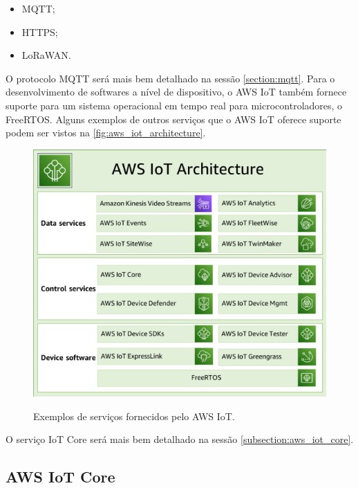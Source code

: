 \begin{itemize}
	\item MQTT;
	\item HTTPS;
	\item LoRaWAN.
\end{itemize}

O protocolo MQTT será mais bem detalhado na sessão \autoref{section:mqtt}. Para o desenvolvimento de softwares a nível de dispositivo, o AWS IoT também fornece suporte para um sistema operacional em tempo real para microcontroladores, o FreeRTOS. Alguns exemplos de outros serviços que o AWS IoT oferece suporte podem ser vistos na \autoref{fig:aws_iot_architecture}.

\begin{figure}[htbp]
	\centering
	\caption{Exemplos de serviços fornecidos pelo AWS IoT.}
	\includegraphics[scale=0.7]{Imagens/aws_iot_architecture.png}
	\label{fig:aws_iot_architecture}
\end{figure}

O serviço IoT Core será mais bem detalhado na sessão \autoref{subsection:aws_iot_core}.

\subsection{AWS IoT Core}\label{subsection:aws_iot_core}

